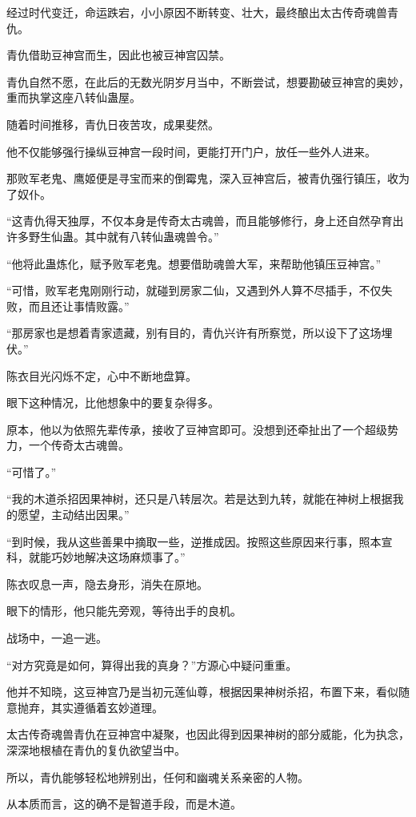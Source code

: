 \begin{this_body}
经过时代变迁，命运跌宕，小小原因不断转变、壮大，最终酿出太古传奇魂兽青仇。

青仇借助豆神宫而生，因此也被豆神宫囚禁。

青仇自然不愿，在此后的无数光阴岁月当中，不断尝试，想要勘破豆神宫的奥妙，重而执掌这座八转仙蛊屋。

随着时间推移，青仇日夜苦攻，成果斐然。

他不仅能够强行操纵豆神宫一段时间，更能打开门户，放任一些外人进来。

那败军老鬼、鹰姬便是寻宝而来的倒霉鬼，深入豆神宫后，被青仇强行镇压，收为了奴仆。

“这青仇得天独厚，不仅本身是传奇太古魂兽，而且能够修行，身上还自然孕育出许多野生仙蛊。其中就有八转仙蛊魂兽令。”

“他将此蛊炼化，赋予败军老鬼。想要借助魂兽大军，来帮助他镇压豆神宫。”

“可惜，败军老鬼刚刚行动，就碰到房家二仙，又遇到外人算不尽插手，不仅失败，而且还让事情败露。”

“那房家也是想着青家遗藏，别有目的，青仇兴许有所察觉，所以设下了这场埋伏。”

陈衣目光闪烁不定，心中不断地盘算。

眼下这种情况，比他想象中的要复杂得多。

原本，他以为依照先辈传承，接收了豆神宫即可。没想到还牵扯出了一个超级势力，一个传奇太古魂兽。

“可惜了。”

“我的木道杀招因果神树，还只是八转层次。若是达到九转，就能在神树上根据我的愿望，主动结出因果。”

“到时候，我从这些善果中摘取一些，逆推成因。按照这些原因来行事，照本宣科，就能巧妙地解决这场麻烦事了。”

陈衣叹息一声，隐去身形，消失在原地。

眼下的情形，他只能先旁观，等待出手的良机。

战场中，一追一逃。

“对方究竟是如何，算得出我的真身？”方源心中疑问重重。

他并不知晓，这豆神宫乃是当初元莲仙尊，根据因果神树杀招，布置下来，看似随意抛弃，其实遵循着玄妙道理。

太古传奇魂兽青仇在豆神宫中凝聚，也因此得到因果神树的部分威能，化为执念，深深地根植在青仇的复仇欲望当中。

所以，青仇能够轻松地辨别出，任何和幽魂关系亲密的人物。

从本质而言，这的确不是智道手段，而是木道。


\end{this_body}
